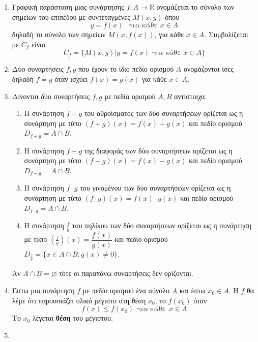 \begin{enumerate}
\item
Γραφική παράσταση μιας συνάρτησης $ f:A\rightarrow\mathbb{R} $ ονομάζεται το σύνολο των σημείων του επιπέδου με συντεταγμένες $ M(x,y) $ όπου \[ y=f(x)\ \ \text{ για κάθε }x\in A \]
δηλαδή το σύνολο των σημείων $ M(x,f(x)) $, για κάθε $ x\in A $. Συμβολίζεται με $ C_f $ είναι 
\[ C_f=\{M(x,y)|y=f(x)\textrm{ για κάθε }x\in A\} \]
\item
Δύο συναρτήσεις $ f,g $ που έχουν το ίδιο πεδίο ορισμού $ A $ ονομάζονται ίσες δηλαδή $ f=g $ όταν ισχύει $ f(x)=g(x) $ για κάθε $ x\in A $.
\item
Δίνονται δύο συναρτήσεις $ f,g $ με πεδία ορισμού $ A,B $ αντίστοιχα. 
\begin{enumerate}
\item Η συνάρτηση $ f+g $ του αθροίσματος των δύο συναρτήσεων ορίζεται ως η συνάρτηση με τύπο $ (f+g)(x)=f(x)+g(x) $ και πεδίο ορισμού $ D_{f+g}=A\cap B $.
\item Η συνάρτηση $ f-g $ της διαφοράς των δύο συναρτήσεων ορίζεται ως η συνάρτηση με τύπο $ (f-g)(x)=f(x)-g(x) $ και πεδίο ορισμού $ D_{f-g}=A\cap B $.
\item Η συνάρτηση $ f\cdot g $ του γινομένου των δύο συναρτήσεων ορίζεται ως η συνάρτηση με τύπο $ (f\cdot g)(x)=f(x)\cdot g(x) $ και πεδίο ορισμού $ D_{f\cdot g}=A\cap B $.
\item Η συνάρτηση $ \frac{f}{g} $ του πηλίκου των δύο συναρτήσεων ορίζεται ως η συνάρτηση με τύπο $ \left(\frac{f}{g}\right)(x)=\dfrac{f(x)}{g(x)} $ και πεδίο ορισμού $ D_{\frac{f}{g}}=\{x\in A\cap B:g(x)\neq 0\} $.
\end{enumerate}
Αν $ A\cap B=\varnothing $ τότε οι παραπάνω συναρτήσεις δεν ορίζονται.
\item
Έστω μια συνάρτηση $ f $ με πεδίο ορισμού ένα σύνολο $ A $ και έστω $ x_0\in A $. Η $ f $ θα λέμε ότι παρουσιάζει ολικό μέγιστο στη θέση $ x_0 $, το $ f(x_0) $ όταν 
\[ f(x)\leq f(x_0)\ \ \textrm{για κάθε}\ \ x\in A \]
Το $ x_0 $ λέγεται \textbf{θέση} του μέγιστου.
\item

\end{enumerate}
